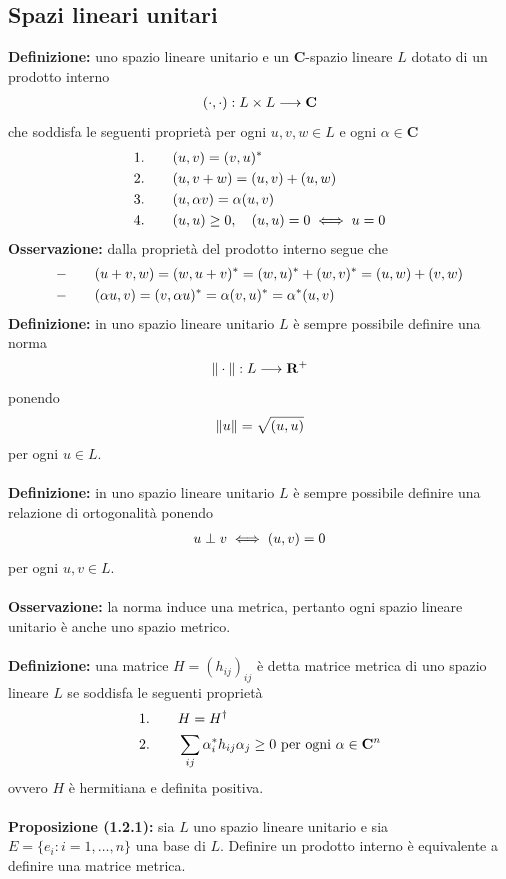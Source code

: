 \documentclass{article}
\begin{document}
\subsection{Spazi lineari unitari}
\textbf{Definizione:} uno spazio lineare unitario e un $\mathbf{C}$-spazio lineare $L$ dotato di un prodotto interno
\begin{gather}
    (\cdot, \cdot) : L \times L \longrightarrow \mathbf{C} \notag
\end{gather}
che soddisfa le seguenti proprietà per ogni $u, v, w \in L$ e ogni $\alpha \in \mathbf{C}$
\begin{align}
    1. \qquad &(u, v) = (v, u)^* \notag \\
    2. \qquad &(u, v + w) = (u, v) + (u, w) \notag \\
    3. \qquad &(u, \alpha v) = \alpha(u, v) \notag \\
    4. \qquad &(u, u) \geq 0, \quad (u, u) = 0 \iff u = 0 \notag
\end{align}
\textbf{Osservazione:} dalla proprietà del prodotto interno segue che
\begin{align}
    - \qquad &(u + v, w) = (w, u + v)^* = (w, u)^* + (w, v)^* = (u, w) + (v, w) \notag \\
    - \qquad &(\alpha u, v) = (v, \alpha u)^* = \alpha(v, u)^* = \alpha^*(u, v) \notag
\end{align}
\textbf{Definizione:} in uno spazio lineare unitario $L$ è sempre possibile definire una norma
\begin{gather}
    \| \cdot \| : L \longrightarrow \mathbf{R}^+ \notag
\end{gather}
ponendo
\begin{gather}
    \|u\| = \sqrt{(u, u)} \notag
\end{gather}
per ogni $u \in L$. \\ \\
\textbf{Definizione:} in uno spazio lineare unitario $L$ è sempre possibile definire una relazione di ortogonalità ponendo
\begin{gather}
    u \perp v \iff (u, v) = 0 \notag
\end{gather}
per ogni $u, v \in L$. \\ \\
\textbf{Osservazione:} la norma induce una metrica, pertanto ogni spazio lineare unitario è anche uno spazio metrico. \\ \\
\textbf{Definizione:} una matrice $H = (h_{ij})_{ij}$ è detta matrice metrica di uno spazio lineare $L$ se soddisfa le seguenti proprietà
\begin{align}
    1. \qquad &H = H^\dagger \notag \\
    2. \qquad &\sum_{ij}\alpha^*_ih_{ij}\alpha_j \geq 0 \text{ per ogni } \alpha \in \mathbf{C}^n \notag
\end{align}
ovvero $H$ è hermitiana e definita positiva. \\ \\
\textbf{Proposizione (1.2.1):} sia $L$ uno spazio lineare unitario e sia $E = \{e_i : i = 1, \dots, n\}$ una base di $L$. Definire un prodotto interno è equivalente a definire una matrice metrica. \\
\end{document}
